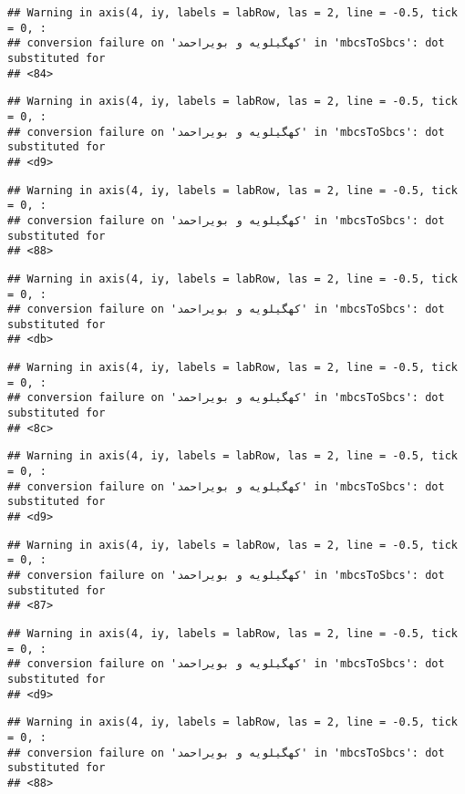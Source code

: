 \documentclass[
]{article}
\begin{document}
\begin{verbatim}
## Warning in axis(4, iy, labels = labRow, las = 2, line = -0.5, tick = 0, :
## conversion failure on 'کهگیلویه و بویراحمد' in 'mbcsToSbcs': dot substituted for
## <84>
\end{verbatim}

\begin{verbatim}
## Warning in axis(4, iy, labels = labRow, las = 2, line = -0.5, tick = 0, :
## conversion failure on 'کهگیلویه و بویراحمد' in 'mbcsToSbcs': dot substituted for
## <d9>
\end{verbatim}

\begin{verbatim}
## Warning in axis(4, iy, labels = labRow, las = 2, line = -0.5, tick = 0, :
## conversion failure on 'کهگیلویه و بویراحمد' in 'mbcsToSbcs': dot substituted for
## <88>
\end{verbatim}

\begin{verbatim}
## Warning in axis(4, iy, labels = labRow, las = 2, line = -0.5, tick = 0, :
## conversion failure on 'کهگیلویه و بویراحمد' in 'mbcsToSbcs': dot substituted for
## <db>
\end{verbatim}

\begin{verbatim}
## Warning in axis(4, iy, labels = labRow, las = 2, line = -0.5, tick = 0, :
## conversion failure on 'کهگیلویه و بویراحمد' in 'mbcsToSbcs': dot substituted for
## <8c>
\end{verbatim}

\begin{verbatim}
## Warning in axis(4, iy, labels = labRow, las = 2, line = -0.5, tick = 0, :
## conversion failure on 'کهگیلویه و بویراحمد' in 'mbcsToSbcs': dot substituted for
## <d9>
\end{verbatim}

\begin{verbatim}
## Warning in axis(4, iy, labels = labRow, las = 2, line = -0.5, tick = 0, :
## conversion failure on 'کهگیلویه و بویراحمد' in 'mbcsToSbcs': dot substituted for
## <87>
\end{verbatim}

\begin{verbatim}
## Warning in axis(4, iy, labels = labRow, las = 2, line = -0.5, tick = 0, :
## conversion failure on 'کهگیلویه و بویراحمد' in 'mbcsToSbcs': dot substituted for
## <d9>
\end{verbatim}

\begin{verbatim}
## Warning in axis(4, iy, labels = labRow, las = 2, line = -0.5, tick = 0, :
## conversion failure on 'کهگیلویه و بویراحمد' in 'mbcsToSbcs': dot substituted for
## <88>
\end{verbatim}
\end{document}
